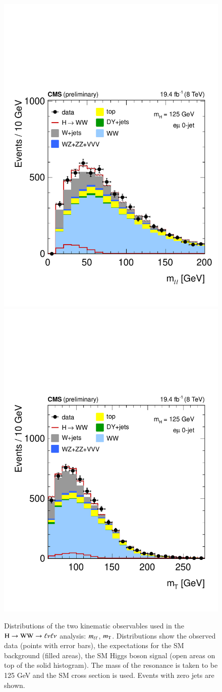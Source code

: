 \begin{figure}[!htbp]
\begin{center}
\centerline{
\includegraphics[width=0.50\linewidth]{figures/wwpresel_0j_mh125_massll.pdf}
\includegraphics[width=0.50\linewidth]{figures/wwpresel_0j_mh125_mt.pdf}
}
\caption{ 
  Distributions of the two kinematic observables
  used in the $\mathrm{H}\to\mathrm{W}\mathrm{W}\to\ell\nu\ell\nu$ analysis: $m_{\ell\ell}$, $m_{\mathrm{T}}$.  Distributions
  show the observed data (points with error bars), the expectations
  for the SM background (filled areas), the SM Higgs boson signal
  (open areas on top of the solid histogram).  The
  mass of the resonance is taken to be 125 GeV and the SM cross
  section is used.  Events with zero jets are shown.  
\label{fig:hwwkinematics} }
\end{center}
\end{figure}


